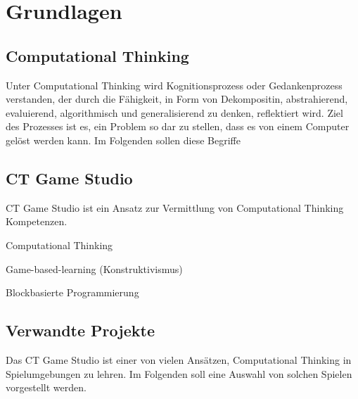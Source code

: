\chapter{Grundlagen}

\section{Computational Thinking}

Unter Computational Thinking wird Kognitionsprozess oder Gedankenprozess verstanden, der durch die
Fähigkeit, in Form von Dekompositin, abstrahierend, evaluierend, algorithmisch und generalisierend
zu denken, reflektiert wird. Ziel des Prozesses ist es, ein Problem so dar zu stellen, dass es von
einem Computer gelöst werden kann. Im Folgenden sollen diese Begriffe

\section{CT Game Studio}

CT Game Studio ist ein Ansatz zur Vermittlung von Computational Thinking Kompetenzen.

Computational Thinking

Game-based-learning (Konstruktivismus)

Blockbasierte Programmierung


\section{Verwandte Projekte}

Das CT Game Studio ist einer von vielen Ansätzen, Computational Thinking in Spielumgebungen zu
lehren. Im Folgenden soll eine Auswahl von solchen Spielen vorgestellt werden.


